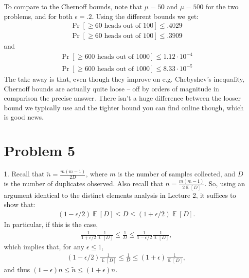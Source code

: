 \documentclass[11pt]{article}
\DeclareMathOperator*{\E}{\mathbb{E}}
\begin{document}
To compare to the Chernoff bounds, note that $\mu = 50$ and $\mu = 500$ for the two problems, and for both $\epsilon = .2$. Using the different bounds we get:
\begin{align*}
	\Pr[\geq 60 \text{ heads out of } 100]\leq .4029\\
	\Pr[\geq 60 \text{ heads out of } 100]\leq .3909
\end{align*}
and 
\begin{align*}
	\Pr[\geq 600 \text{ heads out of } 1000]\leq 1.12 \cdot 10^{-4}\\ 
	\Pr[\geq 600 \text{ heads out of } 1000]\leq  8.33\cdot 10^{-5}
\end{align*}
The take away is that, even though they improve on e.g. Chebyshev's inequality, Chernoff bounds are actually quite loose -- off by orders of magnitude in comparison the precise answer. There isn't a huge difference between the looser bound we typically use and the tighter bound you can find online though, which is good news. 

\section*{Problem 5}
1. Recall that $\tilde{n} = \frac{m(m-1)}{2D}$, where $m$ is the number of samples collected, and $D$ is the number of duplicates observed. Also recall that $n = \frac{m(m-1)}{2\E[D]}$. So, using an argument identical to the distinct elements analysis in Lecture 2, it suffices to show that:
\begin{align}
	\label{to:prove}
	(1-\epsilon/2)\E[D] \leq D \leq (1+\epsilon/2)\E[D].
\end{align}
In particular, if this is the case,
\begin{align*}
	\frac{1}{1+\epsilon/2}\frac{1}{\E[D]} \leq \frac{1}{D} \leq \frac{1}{1-\epsilon/2}\frac{1}{\E[D]}, 
\end{align*}
which implies that, for any $\epsilon \leq 1$,
\begin{align*}
	(1-\epsilon/2)\frac{1}{\E[D]} \leq \frac{1}{D} \leq (1+\epsilon)\frac{1}{\E[D]},
\end{align*}
and thus $(1-\epsilon) n \leq \tilde{n} \leq (1+\epsilon) n$.
\end{document}

